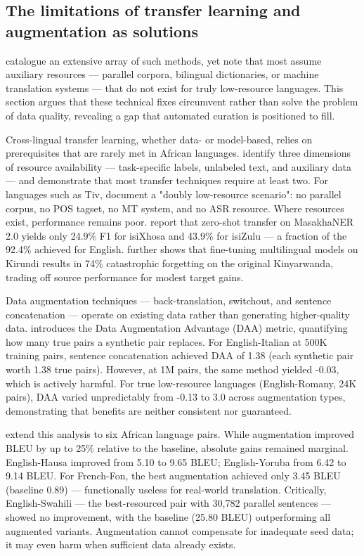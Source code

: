 \documentclass[12pt]{ThesisRU}
\begin{document}
\subsection{The limitations of transfer learning and augmentation as solutions}
\citet{hedderich2021survey} catalogue an extensive array of such methods, yet note that most assume auxiliary resources — parallel corpora, bilingual dictionaries, or machine translation systems — that do not exist for truly low-resource languages. This section argues that these technical fixes circumvent rather than solve the problem of data quality, revealing a gap that automated curation is positioned to fill. 

Cross-lingual transfer learning, whether data- or model-based, relies on prerequisites that are rarely met in African languages. \citet{hedderich2021survey} identify three dimensions of resource availability — task-specific labels, unlabeled text, and auxiliary data — and demonstrate that most transfer techniques require at least two. For languages such as Tiv, \citet{achir2026preservation} document a "doubly low-resource scenario": no parallel corpus, no POS tagset, no MT system, and no ASR resource. Where resources exist, performance remains poor. \citet{garcia2025cross} report that zero-shot transfer on MasakhaNER 2.0 yields only 24.9\% F1 for isiXhosa and 43.9\% for isiZulu — a fraction of the 92.4\% achieved for English. \citet{thangaraj2024cross} further shows that fine-tuning multilingual models on Kirundi results in 74\% catastrophic forgetting on the original Kinyarwanda, trading off source performance for modest target gains.

Data augmentation techniques — back-translation, switchout, and sentence concatenation — operate on existing data rather than generating higher-quality data. \citet{lamar2023measuring} introduces the Data Augmentation Advantage (DAA) metric, quantifying how many true pairs a synthetic pair replaces. For English-Italian at 500K training pairs, sentence concatenation achieved DAA of 1.38 (each synthetic pair worth 1.38 true pairs). However, at 1M pairs, the same method yielded -0.03, which is actively harmful. For true low-resource languages (English-Romany, 24K pairs), DAA varied unpredictably from -0.13 to 3.0 across augmentation types, demonstrating that benefits are neither consistent nor guaranteed.

\citet{oduwole2025scarcity} extend this analysis to six African language pairs. While augmentation improved BLEU by up to 25\% relative to the baseline, absolute gains remained marginal. English-Hausa improved from 5.10 to 9.65 BLEU; English-Yoruba from 6.42 to 9.14 BLEU. For French-Fon, the best augmentation achieved only 3.45 BLEU (baseline 0.89) — functionally useless for real-world translation. Critically, English-Swahili — the best-resourced pair with 30,782 parallel sentences — showed no improvement, with the baseline (25.80 BLEU) outperforming all augmented variants. Augmentation cannot compensate for inadequate seed data; it may even harm when sufficient data already exists.
\end{document}
